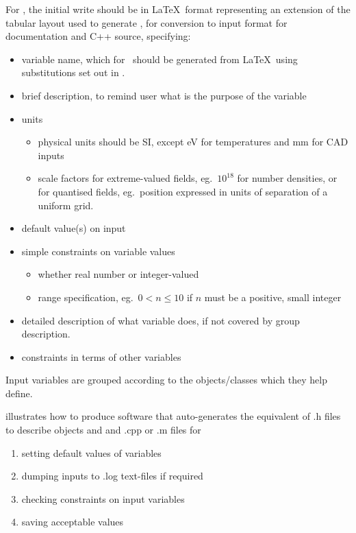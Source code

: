For \nep, the initial write should be in  \LaTeX \ format representing an extension
of the tabular layout used to generate , for conversion to  input
format for documentation and C++ source, specifying:
\begin{itemize}
\item variable name, which for \nep \ should be generated from \LaTeX \ using
substitutions set out in .
\item brief description, to remind user what is the purpose of the variable
\item units
\begin{itemize}
\item physical units should be SI, except eV for temperatures and mm for CAD inputs
\item scale factors for extreme-valued fields, eg.\ $10^{18}$  for number densities, 
or for quantised fields, eg.\ position expressed in units of separation of a uniform grid.
\end{itemize}
\item default value(s) on input
\item simple constraints on variable values
\begin{itemize}
\item whether real number or integer-valued
\item range specification, eg.\ $0 <  n \leq 10$ if $n$ must be a positive, small integer
\end{itemize}
\item detailed description of what variable does, if not covered by group description.
\item constraints in terms of other variables
\end{itemize}
Input variables are grouped according to the objects/classes which they help define.

 illustrates how to produce software that auto-generates the equivalent
of .h files to describe objects and and .cpp or .m  files for 
\begin{enumerate}
\item setting default values of variables
\item dumping inputs to .log text-files if required
\item checking constraints on input variables
\item saving acceptable values 
\end{enumerate}

\clearpage
{}

\clearpage
{}


